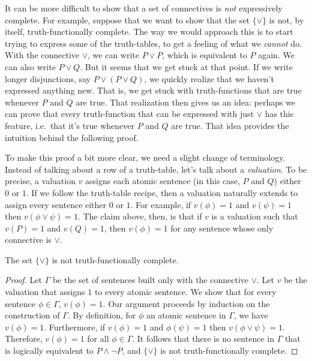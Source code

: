 It can be more difficult to show that a set of connectives is {\it
  not} expressively complete.  For example, suppose that we want to
show that the set $\{ \vee \}$ is not, by itself, truth-functionally
complete.  The way we would approach this is to start trying to
express some of the truth-tables, to get a feeling of what we {\it
  cannot} do.  With the connective $\vee$, we can write $P\vee P$,
which is equivalent to $P$ again.  We can also write $P\vee Q$.  But
it seems that we get stuck at that point.  If we write longer
disjunctions, say $P\vee (P\vee Q)$, we quickly realize that we
haven't expressed anything new.  That is, we get stuck with
truth-functions that are true whenever $P$ and $Q$ are true.  That
realization then gives us an idea: perhaps we can prove that every
truth-function that can be expressed with just $\vee$ has this
feature, i.e.\ that it's true whenever $P$ and $Q$ are true.  That
idea provides the intuition behind the following proof.

  To make this proof a bit more clear, we need a slight change of
  terminology.  Instead of talking about a row of a truth-table, let's
  talk about a \emph{valuation}.  To be precise, a valuation $v$
  assigns each atomic sentence (in this case, $P$ and $Q$) either $0$
  or $1$.  If we follow the truth-table recipe, then a valuation
  naturally extends to assign every sentence either $0$ or $1$.  For
  example, if $v(\phi )=1$ and $v(\psi )=1$ then $v(\phi\vee\psi
  )=1$.  The claim above, then, is that if $v$ is a valuation such
  that $v(P)=1$ and $v(Q)=1$, then $v(\phi )=1$ for any sentence whose
  only connective is $\vee$. 

\begin{prop} The set $\{ \vee\}$ is not truth-functionally
  complete. \end{prop}

\begin{proof} Let $\Gamma$ be the set of sentences built only with the
  connective $\vee$.  Let $v$ be the valuation that assigns $1$ to
  every atomic sentence.  We show that for every sentence
  $\phi\in\Gamma$, $v(\phi )=1$.  Our argument proceeds by induction
  on the construction of $\Gamma$.  By definition, for $\phi$ an
  atomic sentence in $\Gamma$, we have $v(\phi )=1$.  Furthermore, if
  $v(\phi )=1$ and $\phi (\psi )=1$ then $v(\phi\vee\psi )=1$.
  Therefore, $v(\phi )=1$ for all $\phi\in \Gamma$.  It follows that
  there is no sentence in $\Gamma$ that is logically equivalent to
  $P\wedge\neg P$, and $\{ \vee \}$ is not truth-functionally
  complete.
\end{proof}

